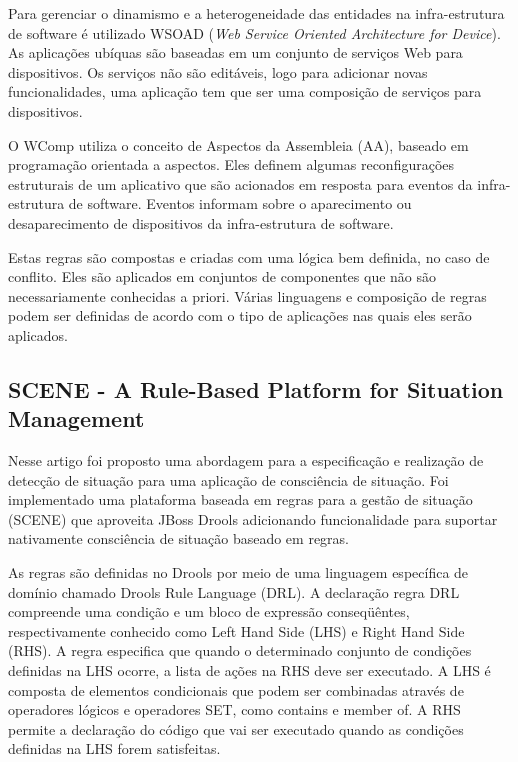 \documentclass[12pt,a4paper,compsoc]{IEEEtran}
\begin{document}
  Para gerenciar o dinamismo e a heterogeneidade das entidades na infra-estrutura de software é
  utilizado WSOAD (\textit{Web Service Oriented Architecture for Device}). As aplicações ubíquas são
  baseadas em um conjunto de serviços Web para dispositivos. Os serviços não são editáveis, logo
  para adicionar novas funcionalidades, uma aplicação tem que ser uma composição de serviços para
  dispositivos.
  
  O WComp utiliza o conceito de Aspectos da Assembleia (AA), baseado em programação orientada a
  aspectos. Eles definem algumas reconfigurações estruturais de um aplicativo que são acionados em
  resposta para eventos da infra-estrutura de software. Eventos informam sobre o aparecimento ou
  desaparecimento de dispositivos da infra-estrutura de software.
  
  Estas regras são compostas e criadas com uma lógica bem definida, no caso de conflito. Eles são
  aplicados em conjuntos de componentes que não são necessariamente conhecidas a priori. Várias
  linguagens e composição de regras podem ser definidas de acordo com o tipo de aplicações nas
  quais eles serão aplicados.


\subsection{SCENE - A Rule-Based Platform for Situation Management}

  Nesse artigo foi proposto uma abordagem para a especificação e realização de detecção de situação
  para uma aplicação de consciência de situação. Foi implementado uma plataforma baseada em regras
  para a gestão de situação (SCENE) que aproveita JBoss Drools adicionando funcionalidade para
  suportar nativamente consciência de situação baseado em regras.
  
  As regras são definidas no Drools por meio de uma linguagem específica de domínio chamado Drools
  Rule Language (DRL). A declaração regra DRL compreende uma condição e um bloco de expressão
  conseqüêntes, respectivamente conhecido como  Left Hand Side (LHS) e Right Hand Side (RHS). A
  regra especifica que quando o determinado conjunto de condições definidas na LHS ocorre, a lista
  de ações na RHS deve ser executado. A LHS é composta de elementos condicionais que podem ser
  combinadas através de operadores lógicos e operadores SET, como  contains e member of. A RHS
  permite a declaração do código que vai ser executado quando as condições definidas na LHS forem
  satisfeitas.
  
\end{document}
